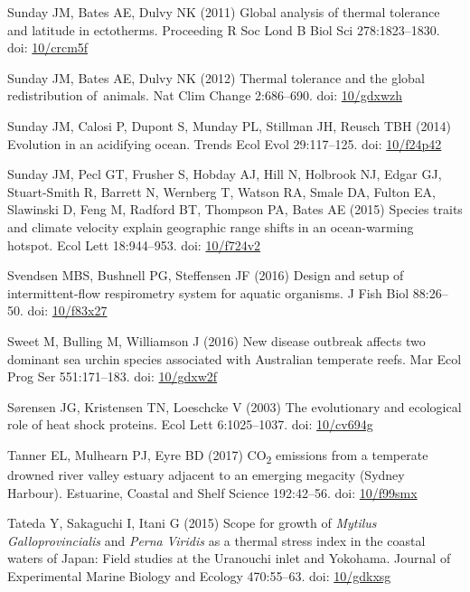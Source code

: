 \documentclass[a4paper,10pt, oneside]{memoir}
\begin{document}
\leavevmode\hypertarget{ref-Sunday2011}{}%
Sunday JM, Bates AE, Dulvy NK (2011) Global analysis of thermal tolerance and latitude in ectotherms. Proceeding R Soc Lond B Biol Sci 278:1823--1830. doi: \href{https://doi.org/10/crcm5f}{10/crcm5f}

\leavevmode\hypertarget{ref-Sunday2012}{}%
Sunday JM, Bates AE, Dulvy NK (2012) Thermal tolerance and the global redistribution of~animals. Nat Clim Change 2:686--690. doi: \href{https://doi.org/10/gdxwzh}{10/gdxwzh}

\leavevmode\hypertarget{ref-Sunday2014}{}%
Sunday JM, Calosi P, Dupont S, Munday PL, Stillman JH, Reusch TBH (2014) Evolution in an acidifying ocean. Trends Ecol Evol 29:117--125. doi: \href{https://doi.org/10/f24p42}{10/f24p42}

\leavevmode\hypertarget{ref-Sunday2015}{}%
Sunday JM, Pecl GT, Frusher S, Hobday AJ, Hill N, Holbrook NJ, Edgar GJ, Stuart-Smith R, Barrett N, Wernberg T, Watson RA, Smale DA, Fulton EA, Slawinski D, Feng M, Radford BT, Thompson PA, Bates AE (2015) Species traits and climate velocity explain geographic range shifts in an ocean-warming hotspot. Ecol Lett 18:944--953. doi: \href{https://doi.org/10/f724v2}{10/f724v2}

\leavevmode\hypertarget{ref-Svendsen2016}{}%
Svendsen MBS, Bushnell PG, Steffensen JF (2016) Design and setup of intermittent-flow respirometry system for aquatic organisms. J Fish Biol 88:26--50. doi: \href{https://doi.org/10/f83x27}{10/f83x27}

\leavevmode\hypertarget{ref-Sweet2016}{}%
Sweet M, Bulling M, Williamson J (2016) New disease outbreak affects two dominant sea urchin species associated with Australian temperate reefs. Mar Ecol Prog Ser 551:171--183. doi: \href{https://doi.org/10/gdxw2f}{10/gdxw2f}

\leavevmode\hypertarget{ref-Sorensen2003}{}%
Sørensen JG, Kristensen TN, Loeschcke V (2003) The evolutionary and ecological role of heat shock proteins. Ecol Lett 6:1025--1037. doi: \href{https://doi.org/10/cv694g}{10/cv694g}

\leavevmode\hypertarget{ref-Tanner2017}{}%
Tanner EL, Mulhearn PJ, Eyre BD (2017) CO\textsubscript{2} emissions from a temperate drowned river valley estuary adjacent to an emerging megacity (Sydney Harbour). Estuarine, Coastal and Shelf Science 192:42--56. doi: \href{https://doi.org/10/f99smx}{10/f99smx}

\leavevmode\hypertarget{ref-Tateda2015}{}%
Tateda Y, Sakaguchi I, Itani G (2015) Scope for growth of \emph{Mytilus} \emph{Galloprovincialis} and \emph{Perna} \emph{Viridis} as a thermal stress index in the coastal waters of Japan: Field studies at the Uranouchi inlet and Yokohama. Journal of Experimental Marine Biology and Ecology 470:55--63. doi: \href{https://doi.org/10/gdkxsg}{10/gdkxsg}
\end{document}
